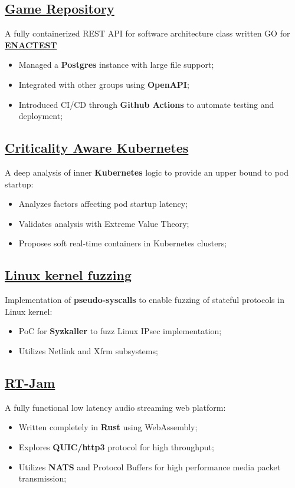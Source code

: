 \documentclass[10pt,a4paper]{article}
\begin{document}
 \subsection{\href{https://github.com/alarmfox/game-repository}{Game Repository}} A fully containerized REST API for software architecture class written GO for \textbf{\href{https://enactest-project.eu/}{ENACTEST}}
 \begin{itemize}
   \item Managed a \textbf{Postgres} instance with large file support;
  \item Integrated with other groups using \textbf{OpenAPI};
  \item Introduced CI/CD through \textbf{Github Actions} to automate testing and deployment;
 \end{itemize}

  \subsection{\href{https://github.com/alarmfox/criticality-aware-kubernetes}{Criticality Aware Kubernetes}}
  A deep analysis of inner \textbf{Kubernetes} logic to provide an upper bound to pod startup:
  \begin{itemize}
    \item Analyzes factors affecting pod startup latency;
    \item Validates analysis with Extreme Value Theory;
    \item Proposes soft real-time containers in Kubernetes clusters;
  \end{itemize}

  \subsection{\href{https://github.com/alarmfox/progetto-software-security}{Linux kernel fuzzing}}
  Implementation of \textbf{pseudo-syscalls} to enable fuzzing of stateful protocols in Linux kernel:
  \begin{itemize}
    \item PoC for \textbf{Syzkaller} to fuzz Linux IPsec implementation;
    \item Utilizes Netlink and Xfrm subsystems;
  \end{itemize}

  \subsection{\href{https://github.com/alarmfox/rt-jam}{RT-Jam}}
  A fully functional low latency audio streaming web platform:
  \begin{itemize}
    \item Written completely in \textbf{Rust} using WebAssembly;
    \item Explores \textbf{QUIC/http3} protocol for high throughput;
    \item Utilizes \textbf{NATS} and Protocol Buffers for high performance media packet transmission;
  \end{itemize}
\end{document}
